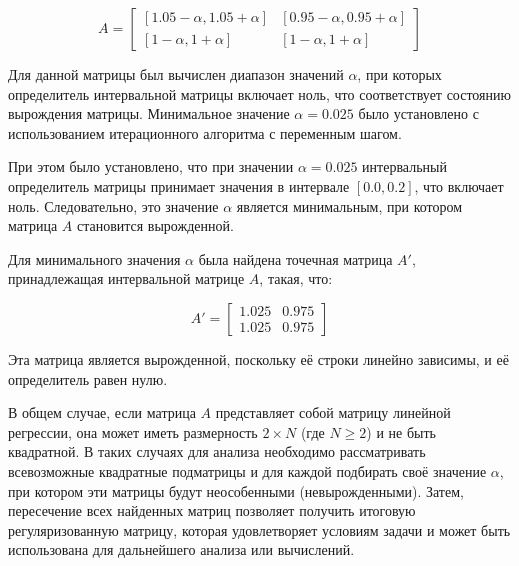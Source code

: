 \documentclass[a4paper,14pt]{article}
\begin{document}
	\[
		A = \begin{bmatrix}
		[1.05 - \alpha, 1.05 + \alpha] & [0.95 - \alpha, 0.95 + \alpha] \\
		[1 - \alpha, 1 + \alpha] & [1 - \alpha, 1 + \alpha]
		\end{bmatrix}
	\]

	Для данной матрицы был вычислен диапазон значений \(\alpha\), при которых
	определитель интервальной матрицы включает ноль, что соответствует
	состоянию вырождения матрицы. Минимальное значение \(\alpha = 0.025\)
	было установлено с использованием итерационного алгоритма с переменным
	шагом.

	При этом было установлено, что при значении \( \alpha = 0.025 \)
	интервальный определитель матрицы принимает значения в интервале
	\( [0.0, 0.2] \), что включает ноль. Следовательно, это значение
	\( \alpha \) является минимальным, при котором матрица \( A \) становится
	вырожденной.

	Для минимального значения \( \alpha \) была найдена точечная матрица
	\(A'\), принадлежащая интервальной матрице \( A \), такая, что:

	\[
		A' = \begin{bmatrix}
		1.025 & 0.975 \\
		1.025 & 0.975
		\end{bmatrix}
	\]

	Эта матрица является вырожденной, поскольку её строки линейно зависимы,
	и её определитель равен нулю.

	В общем случае, если матрица \( A \) представляет собой матрицу линейной
	регрессии, она может иметь размерность \(2 \times N\) (где \(N \geq 2\)) и
	не быть квадратной. В таких случаях для анализа необходимо рассматривать
	всевозможные квадратные подматрицы и для каждой подбирать своё значение
	\( \alpha \), при котором эти матрицы будут неособенными
	(невырожденными). Затем, пересечение всех найденных матриц позволяет
	получить итоговую регуляризованную матрицу, которая удовлетворяет
	условиям задачи и может быть использована для дальнейшего анализа или
	вычислений.
	
\end{document}
